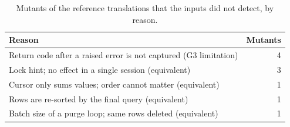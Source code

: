 \begin{table}[t]
\centering
\caption{Mutants of the reference translations that the inputs did not detect, by reason.}
\label{tab:mutants}
\footnotesize
\begin{tabular}{p{}r}
\toprule
Reason & Mutants \\
\midrule
Return code after a raised error is not captured (G3 limitation) & 4 \\
Lock hint; no effect in a single session (equivalent) & 3 \\
Cursor only sums values; order cannot matter (equivalent) & 1 \\
Rows are re-sorted by the final query (equivalent) & 1 \\
Batch size of a purge loop; same rows deleted (equivalent) & 1 \\
\bottomrule
\end{tabular}
\end{table}
